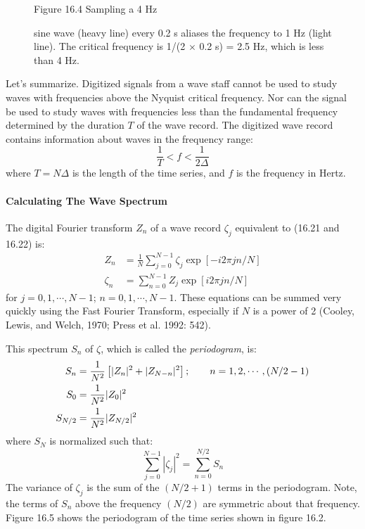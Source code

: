 \begin{figure}[t!]
\footnotesize
\centering
Figure 16.4 Sampling a 4 Hz \rule{0mm}{4ex}sine wave (heavy line) every 0.2 s
aliases the frequency to 1 Hz (light line). The critical frequency is 1/(2
$\times$ 0.2 s) = 2.5 Hz, which is less than 4 Hz.

\label{fig:aliasplot}
\vspace{-3ex}
\end{figure}

Let's summarize. Digitized signals from a wave staff cannot be used to study
waves with frequencies above the Nyquist critical frequency. Nor can the signal
be used to study waves with frequencies less than the fundamental frequency
determined by the duration $T$ of the wave record. The digitized wave record
contains information about waves in the frequency range:
\begin{equation}
\frac{1}{T} < f < \frac{1}{2 \Delta}
\end{equation}
where $T = N \Delta $ is the length of the time series, and $f$
is the frequency in Hertz.

\paragraph{Calculating The Wave Spectrum}
The digital Fourier transform $Z_n$ of a wave record $\zeta
_j$ equivalent to (16.21 and 16.22) is:
\begin{subequations}
\begin{align}
Z_{n} &= \frac{1}{N} \sum_{j=0}^{N-1} \zeta_{j} \exp [-i2 \pi j n /N] \\
\zeta_{n} &= \sum_{n=0}^{N-1} Z_{j} \exp [i 2 \pi j n /N]
\end{align}
\end{subequations}
for $j=0,1,\cdots, N-1$; $n= 0, 1, \cdots , N-1$. These equations can be summed
very quickly using the Fast Fourier Transform, especially if $N$ is a power of
2 (Cooley, Lewis, and Welch, 1970; Press et al. 1992: 542).

This spectrum $S_{n}$ of $\zeta $, which is called the
\textit{periodogram}, is:
\begin{align}
S_{n} &= \frac{1}{N^{2}} \left[ |Z_{n}|^{2} + |Z_{N-n}|^{2} \right] ; \qquad n =
1, 2, \cdots , ( N/2 - 1 ) \\
 S_{0} &= \frac{1}{N^{2}} |Z_{0}|^{2} \notag \\
S_{N/2} &= \frac{1}{N^{2}} |Z_{N/2}|^{2} \notag
\end{align}
where $ S_{N} $ is normalized such that:
\begin{equation}
\sum_{j=0}^{N-1} |\zeta_{j}|^2 = \sum_{n=0}^{N/2} S_{n}
\end{equation}
The variance of $\zeta_{j}$ is the sum of the $(N/2 + 1)$ terms in the
periodogram. Note, the terms of $S_{n}$ above the frequency $(N/2)$ are symmetric
about that frequency. Figure 16.5 shows the periodogram of the time series shown
in figure 16.2.

